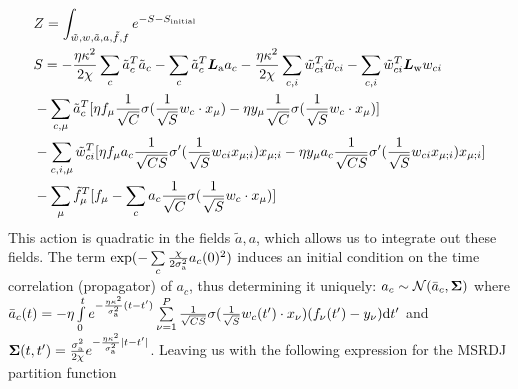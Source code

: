 \begin{align}    
&Z=
\int_{\tilde{w},w,\tilde{a},a,\tilde{f},f} 
e^{-S-S_{\text{initial}}}  \\ \nonumber
&S=
-\frac{\eta\kappa^2}{2\chi}\sum\limits_{c}\tilde{a}_{c}^T\tilde{a}_{c} 
-\sum\limits_{c}\tilde{a}_{c}^T\bm{L}_{\rm a} a_{c}
-\frac{\eta\kappa^2}{2\chi} \sum\limits_{c,i}\tilde{w}_{ci}^T \tilde{w}_{ci} -\sum\limits_{c,i} \tilde{w}_{ci}^T \bm{L}_{\rm w} w_{ci}\\ \nonumber
&-\sum\limits_{c,\mu}\tilde{a}_{c}^T[\eta f_{\mu} \frac{1}{\sqrt{C}}\sigma(\frac{1}{\sqrt{S}}w_{c}\cdot x_{\mu})-\eta y_{\mu}\frac{1}{\sqrt{C}}\sigma(\frac{1}{\sqrt{S}}w_{c}\cdot x_{\mu})] \\ \nonumber
&-\sum\limits_{c,i,\mu}\tilde{w}_{ci}^T [\eta f_{\mu} a_{c} \frac{1}{\sqrt{CS}}\sigma'(\frac{1}{\sqrt{S}}  w_{ci} x_{\mu;i}) x_{\mu;i} -\eta y_{\mu} a_{c} \frac{1}{\sqrt{CS}}\sigma'(\frac{1}{\sqrt{S}} w_{ci} x_{\mu;i}) x_{\mu;i}]\\ \nonumber
&-\sum\limits_{\mu}\tilde{f}_{\mu}^T[f_{\mu}- \sum\limits_{c}a_{c} \frac{1}{\sqrt{C}}\sigma( \frac{1}{\sqrt{S}}w_c\cdot x_{\mu})]
\end{align}
This action is quadratic in the fields $\tilde{a},a$, which allows us to integrate out these fields. The term $\exp(- \sum\limits_c\frac{\chi}{2\sigma_{\rm a}^2} a_c(0)^2)$ induces an initial condition on the time correlation (propagator) of $a_c$, thus determining it uniquely:
$a_{c}\sim \mathcal{N}(\bar{a}_{c},\bm{\Sigma})$ where $\bar{a}_{c}(t)=-\eta \int\limits_0^t   e^{-\frac{\eta\kappa^2}{\sigma_{\rm a}^2}(t-t')} \sum\limits_{\nu=1}^{P} \frac{1}{\sqrt{CS}}\sigma(\frac{1}{\sqrt{S}}w_{c}(t') \cdot x_{\nu}) (f_{\nu}(t')-y_\nu) \text{d} t'$ and $\bm{\Sigma}(t,t')=\frac{\sigma_{\rm a}^2}{2\chi} e^{-\frac{\eta\kappa^2}{\sigma_{\rm a}^2}|t-t'|}$.
Leaving us with the following expression for the MSRDJ partition function

